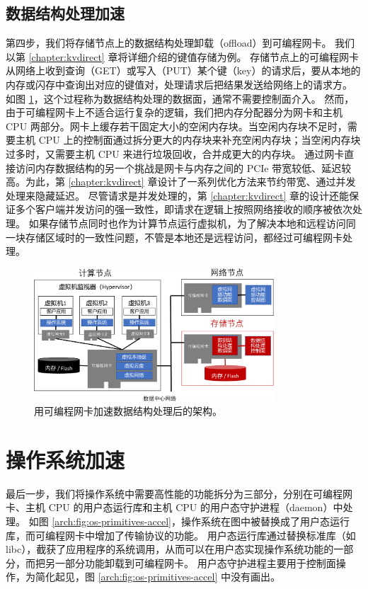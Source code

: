 \subsection{数据结构处理加速}

第四步，我们将存储节点上的数据结构处理卸载（offload）到可编程网卡。
我们以第 \ref{chapter:kvdirect} 章将详细介绍的键值存储为例。
存储节点上的可编程网卡从网络上收到查询（GET）或写入（PUT）某个键（key）的请求后，要从本地的内存或闪存中查询出对应的键值对，处理请求后把结果发送给网络上的请求方。
如图 \ref{arch:fig:data-structure-accel}，这个过程称为数据结构处理的数据面，通常不需要控制面介入。
然而，由于可编程网卡上不适合运行复杂的逻辑，我们把内存分配器分为网卡和主机 CPU 两部分。网卡上缓存若干固定大小的空闲内存块。当空闲内存块不足时，需要主机 CPU 上的控制面通过拆分更大的内存块来补充空闲内存块；当空闲内存块过多时，又需要主机 CPU 来进行垃圾回收，合并成更大的内存块。
通过网卡直接访问内存数据结构的另一个挑战是网卡与内存之间的 PCIe 带宽较低、延迟较高。为此，第 \ref{chapter:kvdirect} 章设计了一系列优化方法来节约带宽、通过并发处理来隐藏延迟。
尽管请求是并发处理的，第 \ref{chapter:kvdirect} 章的设计还能保证多个客户端并发访问的强一致性，即请求在逻辑上按照网络接收的顺序被依次处理。
如果存储节点同时也作为计算节点运行虚拟机，为了解决本地和远程访问同一块存储区域时的一致性问题，不管是本地还是远程访问，都经过可编程网卡处理。

\begin{figure}[htbp]
	\centering
	\includegraphics[width=0.8\textwidth]{figures/data_structure_accel.pdf}
	\caption{用可编程网卡加速数据结构处理后的架构。}
	\label{arch:fig:data-structure-accel}
\end{figure}

\section{操作系统加速}

最后一步，我们将操作系统中需要高性能的功能拆分为三部分，分别在可编程网卡、主机 CPU 的用户态运行库和主机 CPU 的用户态守护进程（daemon）中处理。
如图 \ref{arch:fig:os-primitives-accel}，操作系统在图中被替换成了用户态运行库，而可编程网卡中增加了传输协议的功能。
用户态运行库通过替换标准库（如 libc），截获了应用程序的系统调用，从而可以在用户态实现操作系统功能的一部分，而把另一部分功能卸载到可编程网卡。
用户态守护进程主要用于控制面操作，为简化起见，图 \ref{arch:fig:os-primitives-accel} 中没有画出。

